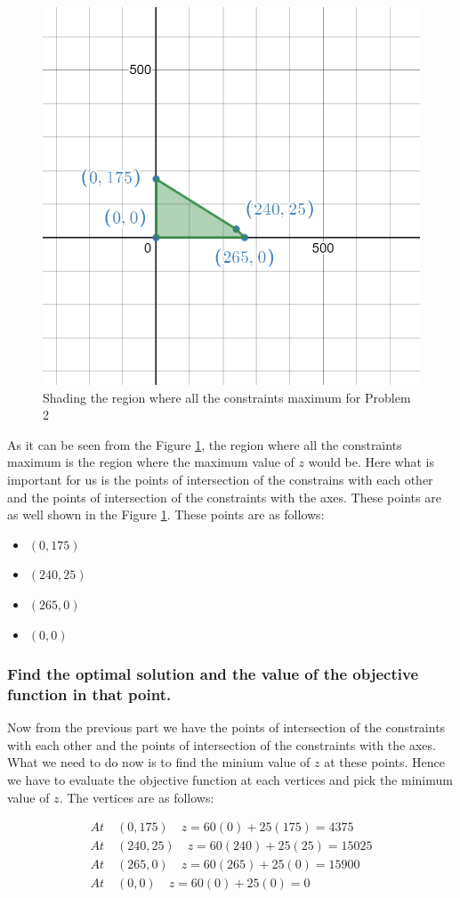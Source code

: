 \documentclass[unicode,11pt,a4paper,oneside,numbers=endperiod,openany]{scrartcl}
\begin{document}
\begin{figure}[H]
	\centering
	\includegraphics[width=0.5\linewidth]{figures/problem_1.2.2.png}
	\caption{Shading the region where all the constraints maximum for Problem 2}
	\label{fig:problem_2.2}
\end{figure}

As it can be seen from the Figure \ref{fig:problem_2.2}, the region where all the constraints maximum is the region where the maximum value of $z$ would be. Here what is important for us is the points of intersection of the constrains with each other and the points of intersection of the constraints with the axes. These points are as well shown in the Figure \ref{fig:problem_2.2}. These points are as follows:

\begin{itemize}
	\item $(0, 175)$
	\item $(240, 25)$
	\item $(265, 0)$
	\item $(0, 0)$
\end{itemize}

\subsubsection{ Find the optimal solution and the value of the objective function in that point.}

Now from the previous part we have the points of intersection of the constraints with each other and the points of intersection of the constraints with the axes. What we need to do now is to find the minium value of $z$ at these points. Hence we have to evaluate the objective function at each vertices and pick the minimum value of $z$. The vertices are as follows:

\begin{equation}
	\begin{aligned}
		At \quad (0, 175) \quad z = 60(0) + 25(175) = 4375    \\
		At \quad (240, 25) \quad z = 60(240) + 25(25) = 15025 \\
		At \quad (265, 0) \quad z = 60(265) + 25(0) = 15900   \\
		At \quad (0, 0) \quad z = 60(0) + 25(0) = 0
	\end{aligned}
	\label{eq:1.1.9}
\end{equation}
\end{document}
